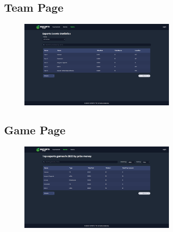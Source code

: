 \subsection{Team Page}
\begin{figure}[h]
    \centering
    \includegraphics[width=0.67\textwidth]{Chapter 3/UI/teams-page}
    \label{fig:Team Page}
\end{figure}

\subsection{Game Page}
\begin{figure}[h]
    \centering
    \includegraphics[width=0.67\textwidth]{Chapter 3/UI/game-page}
    \label{fig:Game Page}
\end{figure}